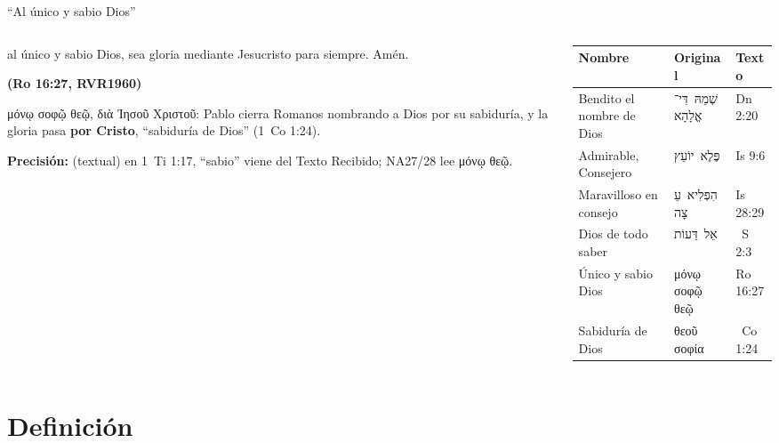 \documentclass[hyperref={bookmarks=false},aspectratio=169]{beamer}
\newcommand{\heb}[1]{\mbox{\foreignlanguage{hebrew}{#1}}}
\newcommand{\grc}[1]{\foreignlanguage{ancientgreek}{#1}}
\newcommand{\fuente}[1]{\par\hfill{\upshape\bfseries\footnotesize\textcolor{azul}{#1}}}
\newcommand{\destacar}[1]{\textbf{\textcolor{azul}{#1}}}
\newcommand{\precision}[1]{{\footnotesize\color{gris}\textbf{Precisión:} #1}}
\begin{document}
\begin{frame}{``Al único y sabio Dios''}
\begin{columns}[c,onlytextwidth]
\begin{column}{0.44\textwidth}
\begin{cita}al único y sabio Dios, sea gloria mediante Jesucristo para siempre. Amén.\fuente{(Ro 16:27, RVR1960)}\end{cita}
\scriptsize\grc{μόνῳ σοφῷ θεῷ, διὰ Ἰησοῦ Χριστοῦ}: Pablo cierra Romanos nombrando a Dios por su sabiduría, y la gloria pasa \destacar{por Cristo}, ``sabiduría de Dios'' (1~Co 1:24).\par\smallskip
\precision{(textual) en 1~Ti 1:17, ``sabio'' viene del Texto Recibido; NA27/28 lee \grc{μόνῳ θεῷ}.}
\end{column}
\begin{column}{0.54\textwidth}\scriptsize
\renewcommand{\arraystretch}{1.15}
\begin{tabular}{@{}>{\RaggedRight\arraybackslash}p{2.6cm}>{\RaggedRight\arraybackslash}p{2.0cm}>{\RaggedRight\arraybackslash}p{1.9cm}@{}}
\toprule
\textbf{Nombre} & \textbf{Original} & \textbf{Texto} \\ \midrule
Bendito el nombre de Dios & \heb{שְׁמֵהּ דִּי־אֱלָהָא} & Dn 2:20 \\
Admirable, Consejero & \heb{פֶּלֶא יוֹעֵץ} & Is 9:6 \\
Maravilloso en consejo & \heb{הִפְלִיא עֵצָה} & Is 28:29 \\
Dios de todo saber & \heb{אֵל דֵּעוֹת} & 1~S 2:3 \\
Único y sabio Dios & \grc{μόνῳ σοφῷ θεῷ} & Ro 16:27 \\
Sabiduría de Dios & \grc{θεοῦ σοφία} & 1~Co 1:24 \\
\bottomrule
\end{tabular}
\end{column}
\end{columns}
\end{frame}

\section{Definición}
\end{document}
